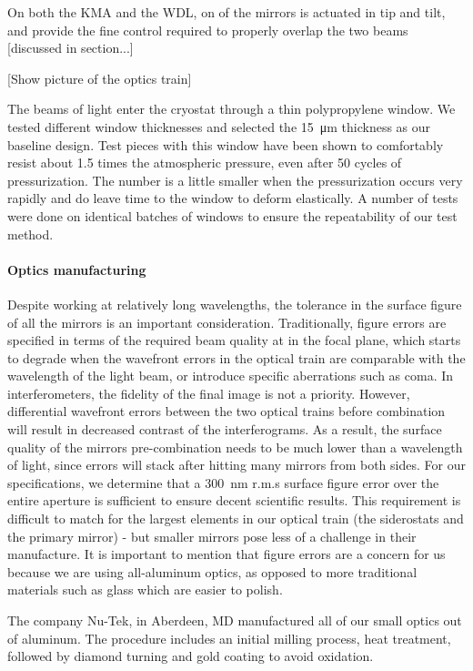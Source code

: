 On both the KMA and the WDL, on of the mirrors is actuated in tip and tilt, and provide the fine control required to properly overlap the two beams [discussed in section...]

[Show picture of the optics train]

The beams of light enter the cryostat through a thin polypropylene window. We tested different window thicknesses and selected the \SI{15}{\micro\meter} thickness as our baseline design. Test pieces with this window have been shown to comfortably resist about 1.5 times the atmospheric pressure, even after 50 cycles of pressurization. The number is a little smaller when the pressurization occurs very rapidly and do leave time to the window to deform elastically. A number of tests were done on identical batches of windows to ensure the repeatability of our test method. 




\paragraph{Optics manufacturing}

Despite working at relatively long wavelengths, the tolerance in the surface figure of all the mirrors is an important consideration. Traditionally, figure errors are specified in terms of the required beam quality at in the focal plane, which starts to degrade when the wavefront errors in the optical train are comparable with the wavelength of the light beam, or introduce specific aberrations such as coma. In interferometers, the fidelity of the final image is not a priority. However, differential wavefront errors between the two optical trains before combination will result in decreased contrast of the interferograms. As a result, the surface quality of the mirrors pre-combination needs to be much lower than a wavelength of light, since errors will stack after hitting many mirrors from both sides. For our specifications, we determine that a \SI{300}{\nano\meter} r.m.s surface figure error over the entire aperture is sufficient to ensure decent scientific results. This requirement is difficult to match for the largest elements in our optical train (the siderostats and the primary mirror) - but smaller mirrors pose less of a challenge in their manufacture. It is important to mention that figure errors are a concern for us because we are using all-aluminum optics, as opposed to more traditional materials such as glass which are easier to polish.

The company Nu-Tek, in Aberdeen, MD manufactured all of our small optics out of aluminum. The procedure includes an initial milling process, heat treatment, followed by diamond turning and gold coating to avoid oxidation.

